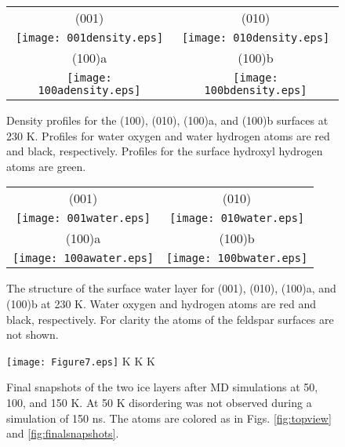 \documentclass[preprint,aps,prb,floatfix]{revtex4-1}
\begin{document}
\clearpage
\begin{figure}
    \centering
    \begin{tabular}{@{}cc@{}}
    (001) & (010) \\[4pt]
    	\texttt{[image: 001density.eps]} &
   	\texttt{[image: 010density.eps]} \\
   	(100)a & (100)b \\[4pt]
   	\texttt{[image: 100adensity.eps]} &
   	\texttt{[image: 100bdensity.eps]} \\
   	\end{tabular}
    \caption{Density profiles for the (100), (010), (100)a, and (100)b surfaces at 230 K. Profiles for water oxygen and water hydrogen atoms are red and black, respectively. Profiles for the surface hydroxyl hydrogen atoms are green.}
     \label{fig:densities}
\end{figure}

\clearpage
\begin{figure}
    \centering
    \begin{tabular}{@{}cc@{}}
    (001) & (010) \\
   	\texttt{[image: 001water.eps]} &
   	\texttt{[image: 010water.eps]} \\
   	(100)a & (100)b  \\
   	\texttt{[image: 100awater.eps]} &
   	\texttt{[image: 100bwater.eps]} \\
   	\end{tabular}
    \caption{The structure of the surface water layer for (001), (010), (100)a, and (100)b at 230 K. Water oxygen and hydrogen atoms are red and black, respectively. For clarity the atoms of the feldspar surfaces are not shown.}
     \label{fig:surfacestructure}
\end{figure}

\clearpage
\begin{figure}
    \centering
    \texttt{[image: Figure7.eps]}\vspace{-0.4cm}
    \newline
    \quad{} K       \quad\quad\quad\quad\quad\quad\quad\quad\quad\quad{} K \quad\quad\quad\quad\quad\quad\quad\quad\quad\quad\quad{} K \\
    \caption{Final snapshots of the two ice layers after MD simulations at 50, 100, and 150 K. At 50 K disordering was not observed during a simulation of 150 ns. The atoms are colored as in Figs. \ref{fig:topview} and \ref{fig:finalsnapshots}.}
      \label{fig:2icelayers}
\end{figure}
\end{document}
